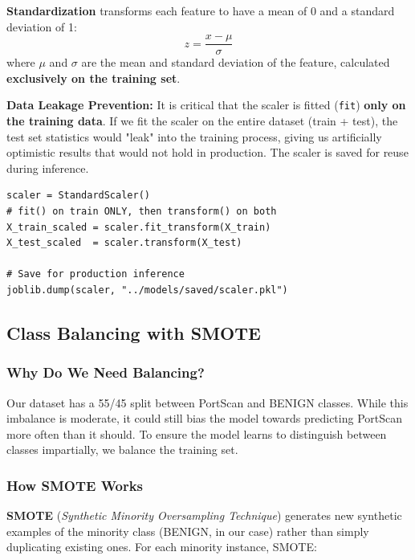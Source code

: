 \documentclass[12pt,a4paper]{report}
\begin{document}
\textbf{Standardization} transforms each feature to have a mean of 0 and a standard deviation of 1:
\begin{equation}
    z = \frac{x - \mu}{\sigma}
\end{equation}
where $\mu$ and $\sigma$ are the mean and standard deviation of the feature, calculated \textbf{exclusively on the training set}.

\textbf{Data Leakage Prevention:} It is critical that the scaler is fitted (\texttt{fit}) \textbf{only on the training data}. If we fit the scaler on the entire dataset (train + test), the test set statistics would "leak" into the training process, giving us artificially optimistic results that would not hold in production. The scaler is saved for reuse during inference.

\begin{lstlisting}[caption={Standardization with data leakage prevention}]
scaler = StandardScaler()
# fit() on train ONLY, then transform() on both
X_train_scaled = scaler.fit_transform(X_train)
X_test_scaled  = scaler.transform(X_test)

# Save for production inference
joblib.dump(scaler, "../models/saved/scaler.pkl")
\end{lstlisting}

\subsection{Class Balancing with SMOTE}
\label{sec:smote}

\subsubsection{Why Do We Need Balancing?}

Our dataset has a 55/45 split between PortScan and BENIGN classes. While this imbalance is moderate, it could still bias the model towards predicting PortScan more often than it should. To ensure the model learns to distinguish between classes impartially, we balance the training set.

\subsubsection{How SMOTE Works}

\textbf{SMOTE} (\textit{Synthetic Minority Oversampling Technique}) generates new synthetic examples of the minority class (BENIGN, in our case) rather than simply duplicating existing ones. For each minority instance, SMOTE:
\end{document}

